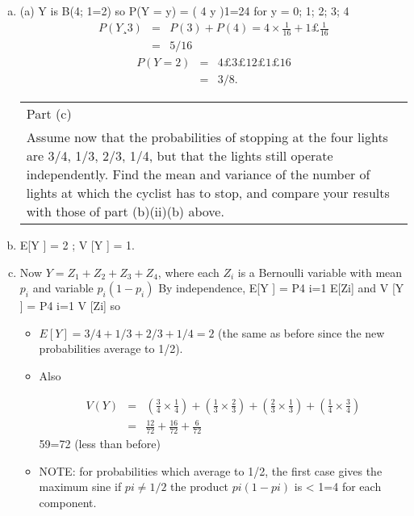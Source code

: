 \documentclass[a4paper,12pt]{article}
\begin{document}
\begin{enumerate}[(a)]

\item  (a) Y is B(4; 1=2) so P(Y = y) = (
4
y
)1=24 for y = 0; 1; 2; 3; 4
\begin{eqnarray*}
P(Y ¸ 3) &=& P(3) + P(4) = 4 \times \frac{1}{16} + 1 £ \frac{1}{16}\\
 &=&  5/16
\end{eqnarray*}
\begin{eqnarray*}
P(Y = 2) &=& 4£3£1 
2£1£16 \\ &=& 3/8.
\end{eqnarray*}



\newpage
  \begin{table}[ht!]
  \centering
  \begin{tabular}{|p{15cm}|}
  \hline
Part (c) \\  
Assume now that the probabilities of stopping at the four lights are 3/4, 1/3, 2/3, 1/4, but that the lights still operate independently.  Find the mean and variance of the number of lights at which the cyclist has to stop, and compare your results with those of part (b)(ii)(b) above.  \\    \hline
   \end{tabular}
 \end{table}

\item E[Y ] = 2 ; V [Y ] = 1.
\item Now $Y = Z_1 + Z_2 + Z_3 + Z_4$, where each $Z_i$ is a Bernoulli variable with mean $p_i$
and variable $p_i(1 - p_i)$ By independence, E[Y ] =
P4
i=1
E[Zi] and V [Y ] =
P4
i=1
V [Zi] so
\begin{itemize}
 \item $E[Y ] = 3/4 + 1/3 + 2/3 + 1/4 = 2$ (the same as before since the new probabilities
average to 1/2).
\item Also 

\begin{eqnarray*}
V(Y) &=& \left(\frac{3}{4} \times \frac{1}{4}\right)
+  \left(\frac{1}{3} \times \frac{2}{3}\right)
+  \left(\frac{2}{3} \times \frac{1}{3}\right)
+  \left(\frac{1}{4} \times \frac{3}{4}\right) \\
 &=& \frac{12}{72} +  \frac{16}{72} + \frac{6}{72}
\end{eqnarray*}
59=72 (less than before)
\item NOTE: for probabilities which average to 1/2, the first case gives the maximum sine
if $ pi \neq 1/2$ the product $pi(1 - pi)$ is < 1=4 for each component.
\end{itemize}

\end{enumerate}
\end{document}
